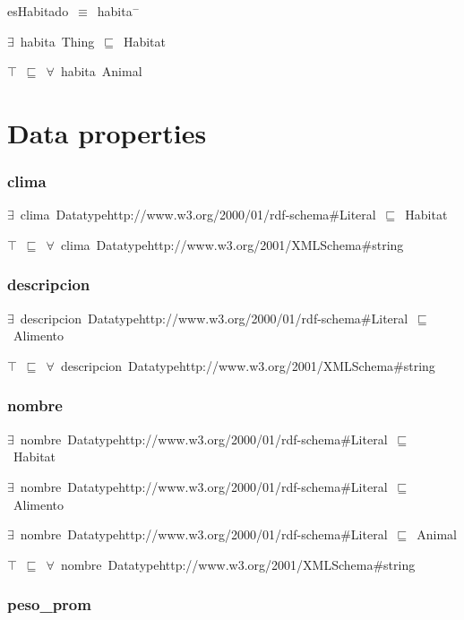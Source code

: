 esHabitado~\ensuremath{\equiv}~habita\ensuremath{^-}

\ensuremath{\exists}~habita~Thing~\ensuremath{\sqsubseteq}~Habitat

\ensuremath{\top}~\ensuremath{\sqsubseteq}~\ensuremath{\forall}~habita~Animal

\section*{Data properties}\subsubsection*{clima}

\ensuremath{\exists}~clima~Datatypehttp://www.w3.org/2000/01/rdf-schema\#Literal~\ensuremath{\sqsubseteq}~Habitat

\ensuremath{\top}~\ensuremath{\sqsubseteq}~\ensuremath{\forall}~clima~Datatypehttp://www.w3.org/2001/XMLSchema\#string

\subsubsection*{descripcion}

\ensuremath{\exists}~descripcion~Datatypehttp://www.w3.org/2000/01/rdf-schema\#Literal~\ensuremath{\sqsubseteq}~Alimento

\ensuremath{\top}~\ensuremath{\sqsubseteq}~\ensuremath{\forall}~descripcion~Datatypehttp://www.w3.org/2001/XMLSchema\#string

\subsubsection*{nombre}

\ensuremath{\exists}~nombre~Datatypehttp://www.w3.org/2000/01/rdf-schema\#Literal~\ensuremath{\sqsubseteq}~Habitat

\ensuremath{\exists}~nombre~Datatypehttp://www.w3.org/2000/01/rdf-schema\#Literal~\ensuremath{\sqsubseteq}~Alimento

\ensuremath{\exists}~nombre~Datatypehttp://www.w3.org/2000/01/rdf-schema\#Literal~\ensuremath{\sqsubseteq}~Animal

\ensuremath{\top}~\ensuremath{\sqsubseteq}~\ensuremath{\forall}~nombre~Datatypehttp://www.w3.org/2001/XMLSchema\#string

\subsubsection*{peso\_prom}

